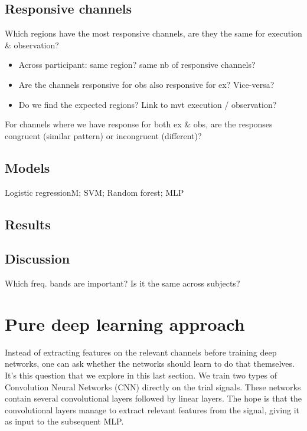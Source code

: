 \documentclass[10pt,conference,compsocconf]{IEEEtran}
\begin{document}
\subsection{Responsive channels}
Which regions have the most responsive channels, are they the same for execution \& observation?

\begin{itemize}
    \item Across participant: same region? same nb of responsive channels?
    \item Are the channels responsive for obs also responsive for ex? Vice-versa?
    \item Do we find the expected regions? Link to mvt execution / observation?
\end{itemize}

For channels where we have response for both ex \& obs, are the responses congruent (similar pattern) or incongruent (different)?

\subsection{Models}
Logistic regressionM; SVM; Random forest; MLP

\subsection{Results}
\subsection{Discussion}
Which freq. bands are important? Is it the same across subjects?

\section{Pure deep learning approach}
\label{sec:deeplearning}
Instead of extracting features on the relevant channels before training deep networks, one can ask whether the networks should learn to do that themselves. It's this question that we explore in this last section. We train two types of Convolution Neural Networks (CNN) directly on the trial signals. These networks contain several convolutional layers followed by linear layers. The hope is that the convolutional layers manage to extract relevant features from the signal, giving it as input to the subsequent MLP.
\end{document}
